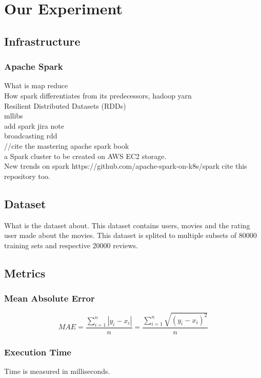 \section{Our Experiment}
\subsection{Infrastructure}
\subsubsection{Apache Spark}
What is map reduce\\
How spark differentiates from its predecessors, hadoop yarn\\
Resilient Distributed Datasets (RDDs) \\
mllibs\\
add spark jira note \\
broadcasting rdd \\
//cite the mastering apache spark book
\cite{ApacheSpark:1} \\
a Spark cluster to be created on AWS EC2 storage.\\
New trends on spark https://github.com/apache-spark-on-k8s/spark cite this repository too.
\subsection{Dataset}
What is the dataset about. This dataset contains users, movies and the rating user made about the movies.
This dataset is splited to multiple subsets of 80000 training sets and respective 20000 reviews.
\cite{MovieLens:3}
\subsection{Metrics}
\subsubsection{Mean Absolute Error}
\begin{equation}
MAE = \frac{\sum_{i=1}^{n}{|y_{i}-x_{i}|} }{n} = \frac{\sum_{i=1}^{n}\sqrt{{(y_{i}-x_{i})}^{2}}}{n}
\end{equation}
\subsubsection{Execution Time}
Time is measured in milliseconds.